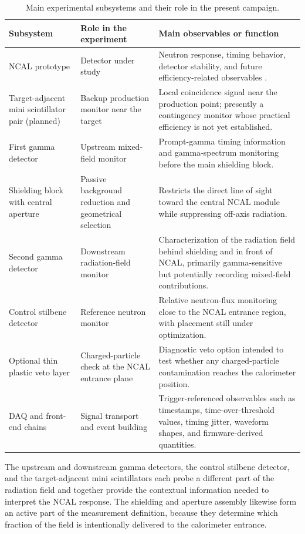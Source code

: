 \begin{table}[htbp]
\centering
\caption{Main experimental subsystems and their role in the present campaign.}
\label{tab:experiment-subsystems}
\small
\setlength{\tabcolsep}{5pt}
\renewcommand{\arraystretch}{1.08}
\begin{tabularx}{\textwidth}{>{\raggedright\arraybackslash}p{3.5cm}YY}
\toprule
Subsystem & Role in the experiment & Main observables or function \\
\midrule
NCAL prototype & Detector under study & Neutron response, timing behavior, detector stability, and future efficiency-related observables \citep{Okropiridze2024SimulationNCAL,Okropiridze2026NCALAddendum}. \\
Target-adjacent mini scintillator pair (planned) & Backup production monitor near the target & Local coincidence signal near the production point; presently a contingency monitor whose practical efficiency is not yet established. \\
First gamma detector & Upstream mixed-field monitor & Prompt-gamma timing information and gamma-spectrum monitoring before the main shielding block. \\
Shielding block with central aperture & Passive background reduction and geometrical selection & Restricts the direct line of sight toward the central NCAL module while suppressing off-axis radiation. \\
Second gamma detector & Downstream radiation-field monitor & Characterization of the radiation field behind shielding and in front of NCAL, primarily gamma-sensitive but potentially recording mixed-field contributions. \\
Control stilbene detector & Reference neutron monitor & Relative neutron-flux monitoring close to the NCAL entrance region, with placement still under optimization. \\
Optional thin plastic veto layer & Charged-particle check at the NCAL entrance plane & Diagnostic veto option intended to test whether any charged-particle contamination reaches the calorimeter position. \\
DAQ and front-end chains & Signal transport and event building & Trigger-referenced observables such as timestamps, time-over-threshold values, timing jitter, waveform shapes, and firmware-derived quantities. \\
\bottomrule
\end{tabularx}
\end{table}

The upstream and downstream gamma detectors, the control stilbene detector, and the target-adjacent mini scintillators each probe a different part of the radiation field and together provide the contextual information needed to interpret the NCAL response. The shielding and aperture assembly likewise form an active part of the measurement definition, because they determine which fraction of the field is intentionally delivered to the calorimeter entrance.

